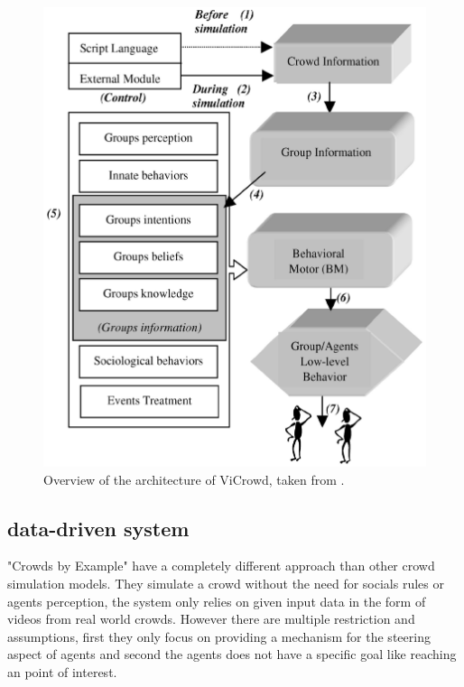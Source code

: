 \documentclass[sigconf]{acmart}
\begin{document}
\begin{figure}[h]
  \centering
  \includegraphics[width=1\linewidth]{images/HierarchicalArchitectureOverview.png}
  \caption{Overview of the architecture of ViCrowd, taken from \cite{musse_hierarchical_2001}.}
  \label{fig:hierarchicalarchitectureOverview}
\end{figure}

\subsection{data-driven system}
"Crowds by Example" \cite{lerner_crowds_2007} have a completely different approach than other crowd simulation models. They simulate a crowd without the need for socials rules or agents perception, the system only relies on given input data in the form of videos from real world crowds.
However there are multiple restriction and assumptions, first they only focus on providing a mechanism for the steering aspect of agents and second the agents does not have a specific goal like reaching an point of interest.
\end{document}
